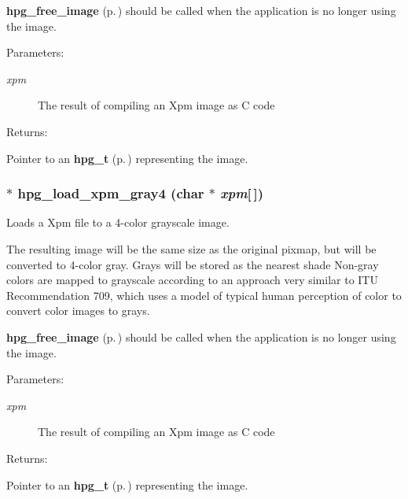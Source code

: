 {\bf hpg\_\-free\_\-image} {\rm (p.\,\pageref{hpgraphics_8h_a78})} should be called when the application is no longer using the image.\begin{Desc}
\item[Parameters: ]\par
\begin{description}
\item[{\em 
xpm}]The result of compiling an Xpm image as C code \end{description}
\end{Desc}
\begin{Desc}
\item[Returns: ]\par
Pointer to an {\bf hpg\_\-t} {\rm (p.\,\pageref{hpgraphics_8h_a24})} representing the image. \end{Desc}
\subsubsection{$\ast$ hpg\_\-load\_\-xpm\_\-gray4 (char $\ast$ {\em xpm}[$\,$])}\label{hpgraphics_8h_a81}


Loads a Xpm file to a 4-color grayscale image.

The resulting image will be the same size as the original pixmap, but will be converted to 4-color gray. Grays will be stored as the nearest shade Non-gray colors are mapped to grayscale according to an approach very similar to ITU Recommendation 709, which uses a model of typical human perception of color to convert color images to grays.

{\bf hpg\_\-free\_\-image} {\rm (p.\,\pageref{hpgraphics_8h_a78})} should be called when the application is no longer using the image.\begin{Desc}
\item[Parameters: ]\par
\begin{description}
\item[{\em 
xpm}]The result of compiling an Xpm image as C code \end{description}
\end{Desc}
\begin{Desc}
\item[Returns: ]\par
Pointer to an {\bf hpg\_\-t} {\rm (p.\,\pageref{hpgraphics_8h_a24})} representing the image. \end{Desc}
